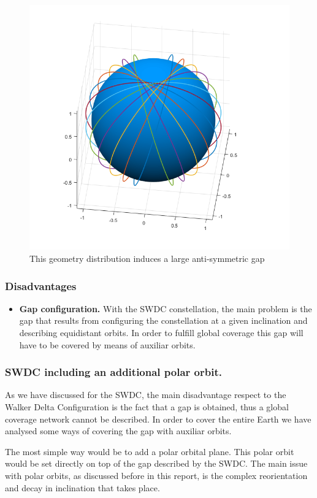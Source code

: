 \begin{figure}[H]
\includegraphics[width=12cm]{semiwalker12}
\centering
\caption{This geometry distribution induces a large anti-symmetric gap}
\end{figure}

\subsubsection{Disadvantages}
\begin{itemize}[label={--}]
\item\textbf{Gap configuration.} With the SWDC constellation, the main problem is the gap that results from configuring the constellation at a given inclination and describing equidistant orbits. In order to fulfill global coverage this gap will have to be covered by means of auxiliar orbits.
\end{itemize}

\subsubsection{SWDC including an additional polar orbit.}
As we have discussed for the SWDC, the main disadvantage respect to the Walker Delta Configuration is the fact that a gap is obtained, thus a global coverage network cannot be described. In order to cover the entire Earth we have analysed some ways of covering the gap with auxiliar orbits.

The most simple way would be to add a polar orbital plane. This polar orbit would be set directly on top of the gap described by the SWDC. The main issue with polar orbits, as discussed before in this report, is the complex reorientation and decay in inclination that takes place.

